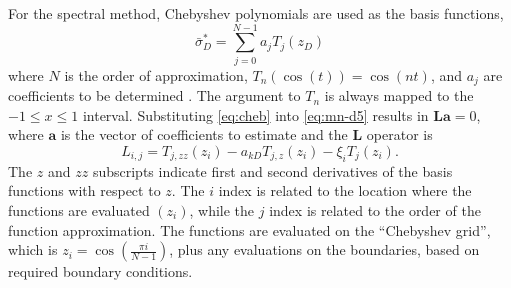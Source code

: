 \documentclass[12pt,letterpaper]{article}
\begin{document}
For the spectral method, Chebyshev polynomials are used as the basis
functions,
\begin{equation}
  \label{eq:cheb}
  \bar{\sigma}^{\ast}_D = \sum_{j=0}^{N-1} a_j T_{j}(z_D)
\end{equation}
where $N$ is the order of approximation, $T_n (\cos(t)) = \cos(nt)$,
and $a_j$ are coefficients to be determined \cite{boyd00}.  The
argument to $T_n$ is always mapped to the $-1\le x \le 1$ interval.
Substituting \eqref{eq:cheb} into \eqref{eq:mn-d5} results in
$\mathbf{L} \mathbf{a} = 0$, where $\mathbf{a}$ is the vector of
coefficients to estimate and the $\mathbf{L}$ operator is
\begin{equation}
  \nonumber
  L_{i,j}= T_{j,zz}(z_i) - a_{kD} T_{j,z}(z_i) - \xi_i T_{j}(z_i).
\end{equation}
The $z$ and $zz$ subscripts indicate first and second derivatives of
the basis functions with respect to $z$.  The $i$ index is related to
the location where the functions are evaluated $(z_i)$, while the $j$
index is related to the order of the function approximation.  The
functions are evaluated on the ``Chebyshev grid'', which is $z_i =
\cos \left( \frac{\pi i}{N-1} \right)$, plus any evaluations on the
boundaries, based on required boundary conditions.



\end{document}
